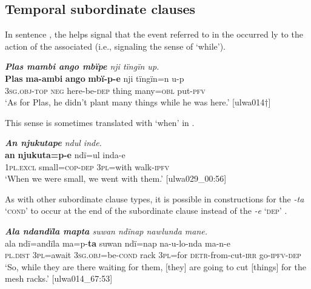 \subsection{Temporal subordinate clauses}\label{sec:12.2.4}


In sentence , the  helps signal that the event referred to in the  occurred ly to the action of the associated  (i.e., signaling the sense of ‘while’).

\ea%
    \label{ex:complex:53}
          \textit{\textbf{Plas mambi ango mbïpe} nji tïngïn up.}\\
\gll    \textbf{Plas}   \textbf{ma-ambi}    \textbf{ango}  \textbf{mbï-p-e}    nji    tïngïn=n u-p\\
    [name]  3\textsc{sg.obj-top}  \textsc{neg}  here-be\textsc{{}-dep} thing  many=\textsc{obl}    put-\textsc{pfv}\\
\glt `As for Plas, he didn’t plant many things while he was here.’ [ulwa014†]
\z

\newpage

This  sense is sometimes translated with ‘when’ in  .

\ea%
    \label{ex:complex:54}
          \textit{\textbf{An njukutape} ndul inde.}\\
\gll    \textbf{an}      \textbf{njukuta=p-e}    ndï=ul    inda-e\\
    1\textsc{pl.excl}  small=\textsc{cop{}-dep} 3\textsc{pl}=with  walk-\textsc{ipfv}\\
\glt `When we were small, we went with them.’ [ulwa029\_00:56]
\z

As with other subordinate clause types, it is possible in  constructions for the   \textit{-ta} ‘\textsc{cond}’ to occur at the end of the subordinate clause instead of the  \textit{-e} ‘\textsc{dep}’ .

\ea%
    \label{ex:complex:55}
          \textit{\textbf{Ala ndandïla mapta} suwan ndïnap nawlunda mane.}\\
\gll    ala      ndï=andïla  ma=p-\textbf{ta}      suwan  ndï=nap na-u-lo-nda      ma-n-e\\
    \textsc{pl.dist}  \textsc{3pl}=await    \textsc{3sg.obj}=be\textsc{{}-cond} rack  3\textsc{pl}=for    \textsc{detr-}from-cut-\textsc{irr}  go-\textsc{ipfv-dep}\\
\glt `So, while they are there waiting for them, [they] are going to cut [things] for the mesh racks.’ [ulwa014\_67:53]
\z

